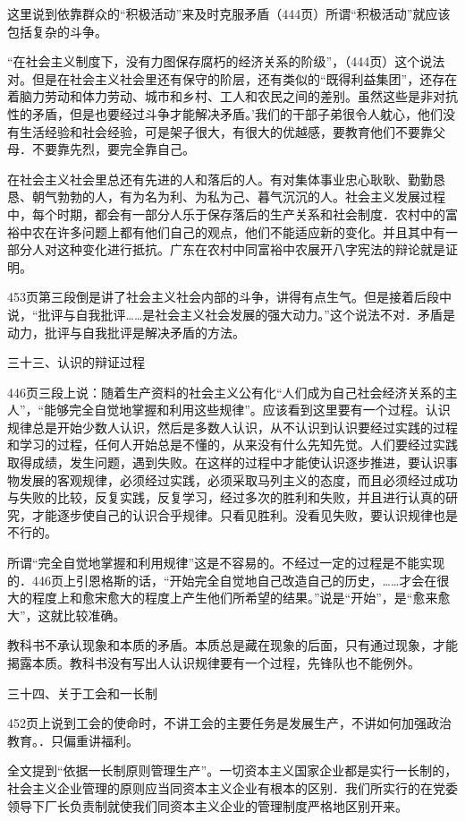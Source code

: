 这里说到依靠群众的“积极活动”来及时克服矛盾（444页）所谓“积极活动”就应该包括复杂的斗争。

“在社会主义制度下，没有力图保存腐朽的经济关系的阶级”，（444页）这个说法对。但是在社会主义社会里还有保守的阶层，还有类似的“既得利益集团”，还存在着脑力劳动和体力劳动、城市和乡村、工人和农民之间的差别。虽然这些是非对抗性的矛盾，但是也要经过斗争才能解决矛盾。’我们的干部子弟很令人躭心，他们没有生活经验和社会经验，可是架子很大，有很大的优越感，要教育他们不要靠父母．不要靠先烈，要完全靠自己。

在社会主义社会里总还有先进的人和落后的人。有对集体事业忠心耿耿、勤勤恳恳、朝气勃勃的人，有为名为利、为私为己、暮气沉沉的人。社会主义发展过程中，每个时期，都会有一部分人乐于保存落后的生产关系和社会制度．农村中的富裕中农在许多问题上都有他们自己的观点，他们不能适应新的变化。并且其中有一部分人对这种变化进行抵抗。广东在农村中同富裕中农展开八字宪法的辩论就是证明。

453页第三段倒是讲了社会主义社会内部的斗争，讲得有点生气。但是接着后段中说，“批评与自我批评……是社会主义社会发展的强大动力。”这个说法不对．矛盾是动力，批评与自我批评是解决矛盾的方法。

三十三、认识的辩证过程

446页三段上说：随着生产资料的社会主义公有化“人们成为自己社会经济关系的主人”，“能够完全自觉地掌握和利用这些规律”。应该看到这里要有一个过程。认识规律总是开始少数人认识，然后是多数人认识，从不认识到认识要经过实践的过程和学习的过程，任何人开始总是不懂的，从来没有什么先知先觉。人们要经过实践取得成绩，发生问题，遇到失败。在这样的过程中才能使认识逐步推进，要认识事物发展的客观规律，必须经过实践，必须采取马列主义的态度，而且必须经过成功与失败的比较，反复实践，反复学习，经过多次的胜利和失败，并且进行认真的研究，才能逐步使自己的认识合乎规律。只看见胜利。没看见失败，要认识规律也是不行的。

所谓“完全自觉地掌握和利用规律”这是不容易的。不经过一定的过程是不能实现的．446页上引恩格斯的话，“开始完全自觉地自己改造自己的历史，……才会在很大的程度上和愈宋愈大的程度上产生他们所希望的结果。”说是“开始”，是“愈来愈大”，这就比较准确。

教科书不承认现象和本质的矛盾。本质总是藏在现象的后面，只有通过现象，才能揭露本质。教科书没有写出人认识规律要有一个过程，先锋队也不能例外。

三十四、关于工会和一长制

452页上说到工会的使命时，不讲工会的主要任务是发展生产，不讲如何加强政治教育。．只偏重讲福利。

全文提到“依据一长制原则管理生产”。一切资本主义国家企业都是实行一长制的，社会主义企业管理的原则应当同资本主义企业有根本的区别．我们所实行的在党委领导下厂长负责制就使我们同资本主义企业的管理制度严格地区别开来。

